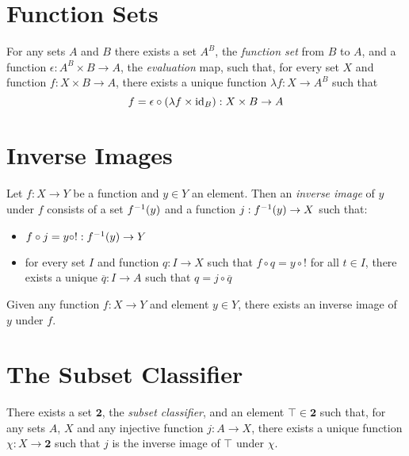 \section{Function Sets}

\begin{ax}
  For any sets $A$ and $B$ there exists a set $A^B$, the \emph{function set} from $B$ to $A$, and a function $\epsilon : A^B \times B \rightarrow A$, the \emph{evaluation} map, such that, for every set $X$ and function $f : X \times B \rightarrow A$, there exists a unique function $\lambda f : X \rightarrow A^B$ such that
  \[ f = \epsilon \circ (\lambda f \times \mathrm{id}_{B}) : X \times B \rightarrow A \]
\end{ax}

\section{Inverse Images}

\begin{df}
  Let $f : X \rightarrow Y$ be a function and $y \in Y$ an element. Then an \emph{inverse image} of $y$ under $f$ consists of a set ${f}^{-1}(y)$ and a function $j : {f}^{-1}(y) \rightarrow X$ such that:
  \begin{itemize}
    \item
    $f \circ j = y \circ ! : {f}^{-1}(y) \rightarrow Y$
    \item
    for every set $I$ and function $q : I \rightarrow X$ such that $f \circ q = y \circ !$ for all $t \in I$, there exists a unique $\overline{q} : I \rightarrow A$ such that $q = j \circ \overline{q}$
  \end{itemize}
\end{df}

\begin{ax}
  Given any function $f : X \rightarrow Y$ and element $y \in Y$, there exists an inverse image of $y$ under $f$.
\end{ax}

\section{The Subset Classifier}

\begin{ax}
  There exists a set $\mathbf{2}$, the \emph{subset classifier}, and an element $\top \in \mathbf{2}$ such that, for any sets $A$, $X$ and any injective function $j : A \rightarrow X$, there exists a unique function $\chi : X \rightarrow \mathbf{2}$ such that $j$ is the inverse image of $\top$ under $\chi$.
\end{ax}

